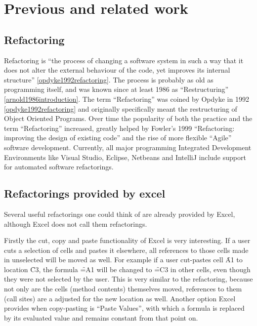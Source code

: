 
\chapter{Previous and related work}
\label{chapter:previouswork}

\section{Refactoring}

Refactoring is ``the process of changing a software system in such a way that it does not alter the external behaviour of the code, yet improves its internal structure'' \ref{opdyke1992refactoring}.
The process is probably as old as programming itself, and was known since at least 1986 as ``Restructuring'' \ref{arnold1986introduction}.
The term ``Refactoring'' was coined by Opdyke in 1992 \ref{opdyke1992refactoring} and originally specifically meant the restructuring of Object Oriented Programs. 
Over time the popularity of both the practice and the term ``Refactoring'' increased, greatly helped by Fowler's 1999 ``Refactoring: improving the design of existing code'' \cite{fowler1999refactoring} and the rise of more flexible ``Agile'' software development.
Currently, all major programming Integrated Development Environments like Visual Studio, Eclipse, Netbeans and IntelliJ include support for automated software refactorings.

\section{Refactorings provided by excel}

Several useful refactorings one could think of are already provided by Excel, although Excel does not call them refactorings.

Firstly the cut, copy and paste functionality of Excel is very interesting.
If a user cuts a selection of cells and pastes it elsewhere, all references to those cells made in unselected will be moved as well.
For example if a user cut-pastes cell \f{A1} to location \f{C3}, the formula \f{=A1} will be changed to \f{=C3} in other cells, even though they were not selected by the user.
This is very similar to the  \cite{fowler1999refactoring} refactoring, because not only are the cells (method contents) themselves moved, references to them (call sites) are a adjusted for the new location as well.
Another option Excel provides when copy-pasting is ``Paste Values'', with which a formula is replaced by its evaluated value and remains constant from that point on.

